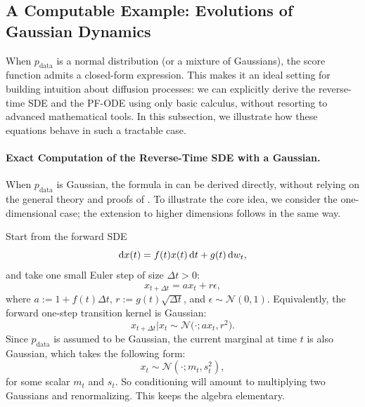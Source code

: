 \subsection{A Computable Example: Evolutions of Gaussian Dynamics}\label{subsec:example-gaussian}
When $p_{\mathrm{data}}$ is a normal distribution (or a mixture of Gaussians), the score function admits a closed-form expression. 
This makes it an ideal setting for building intuition about diffusion processes: we can explicitly derive the reverse-time SDE and the PF-ODE using only basic calculus, without resorting to advanced mathematical tools. 
In this subsection, we illustrate how these equations behave in such a tractable case.



\paragraph{Exact Computation of the Reverse-Time SDE with a Gaussian.}
 When $p_{\mathrm{data}}$ is Gaussian, the formula in  can be derived directly, without relying on the general theory and proofs of \citet{anderson1982reverse}. To illustrate the core idea, we consider the one-dimensional case; the extension to higher dimensions follows in the same way.

 


Start from the forward SDE
\[
\mathop{}\!\mathrm{d} x(t)  =  f(t)  x(t)  \mathop{}\!\mathrm{d} t  +  g(t)  \mathop{}\!\mathrm{d} w_t,
\]
and take one small Euler step of size $\Delta t>0$:
\[
x_{t+\Delta t}  =  a  x_t  +  r  \epsilon,
\]
where $a:=1+f(t)\Delta t$, $r:=g(t)\sqrt{\Delta t}$, and $ \epsilon\sim\mathcal N(0,1)$. Equivalently, the forward one-step transition kernel is Gaussian:
\[
x_{t+\Delta t}   |   x_t  \sim  \mathcal N\!\big(\cdot;a  x_t,   r^2\big).
\]
Since $p_{\mathrm{data}}$ is assumed to be Gaussian, the current marginal at time $t$ is also Gaussian, which takes the following form:
\[
x_t \sim \mathcal N(\cdot;m_t,   s_t^2),
\]
for some scalar $m_t$ and $s_t$. So conditioning will amount to multiplying two Gaussians and renormalizing. This keeps the algebra elementary.

